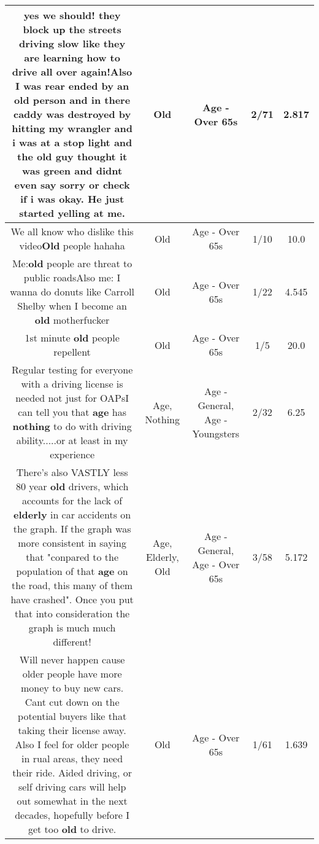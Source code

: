 \documentclass[11pt]{article}
\newlength\mylength
\begin{document}
\begin{center}
\begin{longtable}{|C{.65\mylength}|C{.30\mylength}|C{.12\mylength}|C{.12\mylength}|C{.12\mylength}|}
  \small yes we should! they block up the streets driving slow like they are learning how to drive all over again!Also I was rear ended by an \textbf{old} person and in there caddy was destroyed by hitting my wrangler and i was at a stop light and the \textbf{old} guy thought it was green and didnt even say sorry or check if i was okay. He just started yelling at me.\normalsize   & Old & Age - Over 65s & 2/71 & 2.817 \\  \hline
  \small We all know who dislike this video\textbf{Old} people hahaha\normalsize   & Old & Age - Over 65s & 1/10 & 10.0 \\  \hline
  \small Me:\textbf{old} people are threat to public roadsAlso me: I wanna do donuts like Carroll Shelby when I become an \textbf{old} motherfucker\normalsize   & Old & Age - Over 65s & 1/22 & 4.545 \\  \hline
  \small 1st minute \textbf{old}  people repellent\normalsize   & Old & Age - Over 65s & 1/5 & 20.0 \\  \hline
  \small Regular testing for everyone with a driving license is needed not just for OAPsI can tell you that \textbf{age} has \textbf{nothing} to do with driving ability.....or at least in my experience\normalsize   & Age, Nothing & Age - General, Age - Youngsters & 2/32 & 6.25 \\  \hline
  \small There's also VASTLY less 80 year \textbf{old} drivers, which accounts for the lack of \textbf{elderly} in car accidents on the graph. If the graph was more consistent in saying that "conpared to the population of that \textbf{age} on the road, this many of them have crashed". Once you put that into consideration the graph is much much different!\normalsize   & Age, Elderly, Old & Age - General, Age - Over 65s & 3/58 & 5.172 \\  \hline
  \small Will never happen cause older people have more money to buy new cars. Cant cut down on the potential buyers like that taking their license away. Also I feel for older people in rual areas, they need their ride. Aided driving, or self driving cars will help out somewhat in the next decades, hopefully before I get too \textbf{old} to drive.\normalsize   & Old & Age - Over 65s & 1/61 & 1.639 \\  \hline

\end{longtable}
\end{center}
\end{document}
